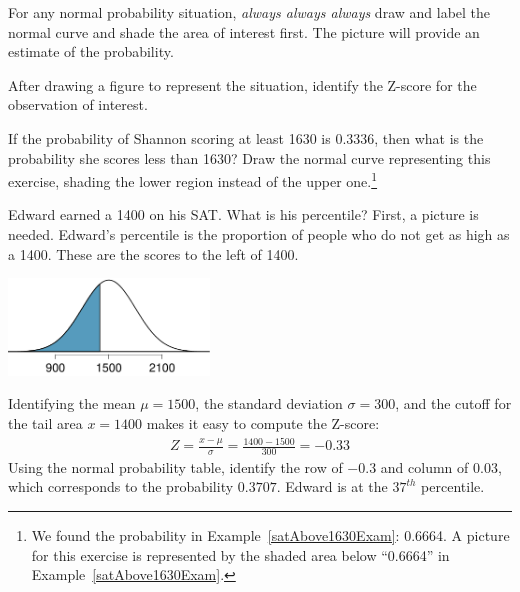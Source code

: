 \begin{tipBox}{
For any normal probability situation, \emph{always always always} draw and label the normal curve and shade the area of interest first. The picture will provide an estimate of the probability. \vspace{3mm}

After drawing a figure to represent the situation, identify the Z-score for the observation of interest.\vspace{1mm}}
\end{tipBox}

\begin{exercise}
If the probability of Shannon scoring at least 1630 is 0.3336, then what is the probability she scores less than 1630? Draw the normal curve representing this exercise, shading the lower region instead of the upper one.\footnote{We found the probability in Example~\ref{satAbove1630Exam}: 0.6664. A picture for this exercise is represented by the shaded area below ``0.6664'' in Example~\ref{satAbove1630Exam}.}
\end{exercise}

\begin{example}{Edward earned a 1400 on his SAT. What is his percentile?} \label{edwardSatBelow1400}
First, a picture is needed. Edward's percentile is the proportion of people who do not get as high as a 1400. These are the scores to the left of 1400.
\begin{center}
\includegraphics[width=0.4\textwidth]{ch_distributions/figures/satBelow1400/satBelow1400}
\end{center}
Identifying the mean $\mu=1500$, the standard deviation $\sigma=300$, and the cutoff for the tail area $x=1400$ makes it easy to compute the Z-score:
\begin{eqnarray*}
Z = \frac{x - \mu}{\sigma} = \frac{1400 - 1500}{300} = -0.33
\end{eqnarray*}
Using the normal probability table, identify the row of $-0.3$ and column of $0.03$, which corresponds to the probability $0.3707$. Edward is at the $37^{th}$ percentile.
\end{example}

